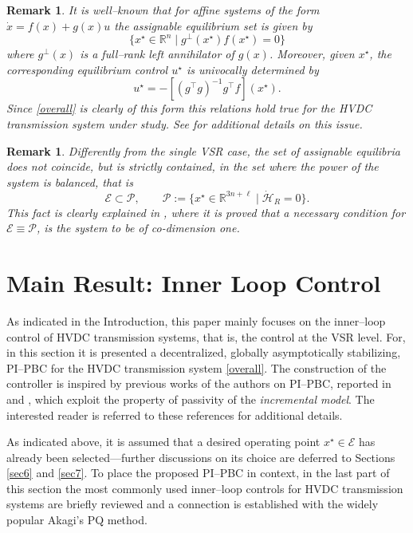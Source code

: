 \documentclass[5p,twocolumn]{elsarticle}
\def\rea{\mathbb{R}}
\newtheorem{remark}[theorem]{Remark}
\numberwithin{equation}{section}
\begin{document}
\begin{remark}\em
\label{remU}
It is well--known that for affine systems of the form $\dot x = f(x)+g(x)u$ the assignable equilibrium set is given by
$$
\{ x^\star  \in \rea^n\;\vert\; g^\perp(x^\star )f(x^\star )=0\}
$$
where $g^\perp(x)$ is a full--rank left annihilator of $g(x)$. Moreover, given $x^\star $, the corresponding equilibrium control $u^\star $ is {\em univocally} determined by
$$
u^\star =-\left[ (g^\top g)^{-1}g^\top f\right] (x^\star ).
$$
Since \eqref{overall} is clearly of this form this relations hold true for the HVDC transmission system under study. See  \cite{sanchez} for additional details on this issue.
\end{remark}

\begin{remark}\em
Differently from the single VSR case, the set of assignable equilibria does not coincide, but is strictly contained, in the set where the power of the system is balanced, that is
$$
\mathcal{E}\subset\mathcal{P},\qquad \mathcal{P}:=\{x^\star\in\mathbb{R}^{3n+\ell}\;\vert\;\dot{\mathcal{H}}_R=0\}.
$$
This fact is clearly explained in \cite{sanchez}, where it is proved that a necessary condition for $\mathcal{E}\equiv\mathcal{P}$, is the system to be of co-dimension one.
\end{remark}

\section{Main Result: Inner Loop Control}
\label{main}
As indicated in the Introduction, this paper mainly focuses on the inner--loop control of HVDC transmission systems, that is, the control at the VSR level. For, in this
section it is presented a decentralized, globally asymptotically stabilizing, PI--PBC for the HVDC transmission system \eqref{overall}. The construction of the controller is inspired by previous works of the authors on PI--PBC, reported
in \cite{HERetal} and \cite{JAYetal}, which exploit the property of passivity of the \textit{incremental model}. The interested reader is referred to these references for additional details.

As indicated above, it is assumed that a desired operating point $x^\star \in \mathcal{E}$ has already been selected---further discussions on its choice are deferred to Sections \ref{sec6} and \ref{sec7}. To place the proposed PI--PBC in context, in the last part of this section the most commonly used inner--loop controls for HVDC transmission systems are  briefly reviewed and a connection is established with the widely popular Akagi's PQ method.
\end{document}
